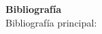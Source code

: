 \documentclass[letterpaper,10pt,onecolumn]{article}
\begin{document}









\vspace*{0.5cm} 

\noindent\textbf{\large {} \quad
  Bibliograf\'ia}\\[-0.2cm] 



\noindent\normalsize Bibliograf\'ia principal:
\end{document}
